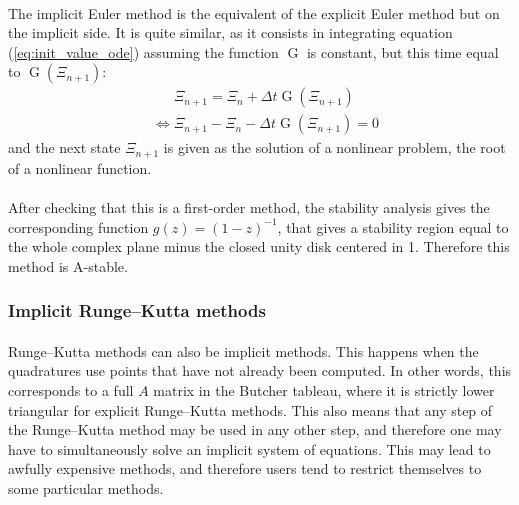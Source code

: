         \paragraph{}
        The implicit Euler method is the equivalent of the explicit Euler method but on the implicit side.
        It is quite similar, as it consists in integrating equation (\ref{eq:init_value_ode}) assuming the function $\operatorname{G}$ is constant, but this time equal to $\operatorname{G}\left(\Xi_{n+1}\right)$:
        \begin{equation}
          \begin{aligned}
            & \phantom{{} \Leftrightarrow {}} \Xi_{n+1} = \Xi_n + \Delta t \operatorname{G}\left(\Xi_{n+1}\right) \\
            &             \Leftrightarrow     \Xi_{n+1} - \Xi_n - \Delta t \operatorname{G}\left(\Xi_{n+1}\right) = 0
          \end{aligned}
        \end{equation}
        and the next state $\Xi_{n+1}$ is given as the solution of a nonlinear problem, the root of a nonlinear function.

        \paragraph{}
        After checking that this is a first-order method, the stability analysis gives the corresponding function $g\left(z\right) = \left(1 - z\right)^{-1}$, that gives a stability region equal to the whole complex plane minus the closed unity disk centered in 1.
        Therefore this method is A-stable.


      \subsubsection{Implicit Runge--Kutta methods}

        \paragraph{}
        Runge--Kutta methods can also be implicit methods.
        This happens when the quadratures use points that have not already been computed.
        In other words, this corresponds to a full $A$ matrix in the Butcher tableau, where it is strictly lower triangular for explicit Runge--Kutta methods.
        This also means that any step of the Runge--Kutta method may be used in any other step, and therefore one may have to simultaneously solve an implicit system of equations.
        This may lead to awfully expensive methods, and therefore users tend to restrict themselves to some particular methods.

